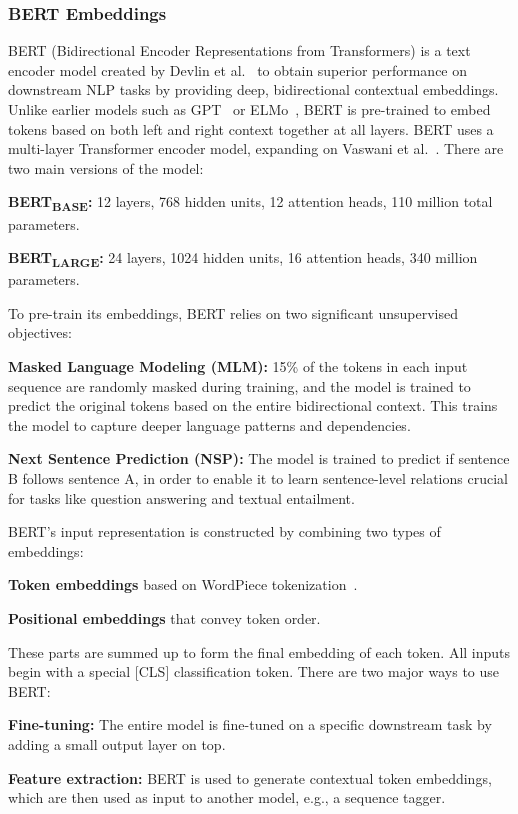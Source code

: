 \subsubsection{BERT Embeddings}
BERT (Bidirectional Encoder Representations from Transformers) is a text encoder model created by Devlin et al.~\cite{2019-bert} to obtain superior performance on downstream NLP tasks by providing deep, bidirectional contextual embeddings. Unlike earlier models such as GPT~\cite{gpt-2018} or ELMo~\cite{elmo}, BERT is pre-trained to embed tokens based on both left and right context together at all layers.
BERT uses a multi-layer Transformer encoder model, expanding on Vaswani et al.~\cite{attention-2017}. There are two main versions of the model:
\begin{compactitem}
\item\textbf{BERT\textsubscript{BASE}:} 12 layers, 768 hidden units, 12 attention heads, 110 million total parameters.
\item \textbf{BERT\textsubscript{LARGE}:} 24 layers, 1024 hidden units, 16 attention heads, 340 million parameters.
\end{compactitem}
To pre-train its embeddings, BERT relies on two significant unsupervised objectives:
\begin{compactitem}
\item \textbf{Masked Language Modeling (MLM):} 15\% of the tokens in each input sequence are randomly masked during training, and the model is trained to predict the original tokens based on the entire bidirectional context. This trains the model to capture deeper language patterns and dependencies.
\item \textbf{Next Sentence Prediction (NSP):} The model is trained to predict if sentence B follows sentence A, in order to enable it to learn sentence-level relations crucial for tasks like question answering and textual entailment.
\end{compactitem}
BERT's input representation is constructed by combining two types of embeddings:
\begin{compactitem}
\item \textbf{Token embeddings} based on WordPiece tokenization~\cite{wordpiece}.
\item \textbf{Positional embeddings} that convey token order.
\end{compactitem}
These parts are summed up to form the final embedding of each token. All inputs begin with a special [CLS] classification token.
There are two major ways to use BERT:
\begin{compactitem}
\item \textbf{Fine-tuning:} The entire model is fine-tuned on a specific downstream task by adding a small output layer on top.
\item \textbf{Feature extraction:} BERT is used to generate contextual token embeddings, which are then used as input to another model, e.g., a sequence tagger.
\end{compactitem}

